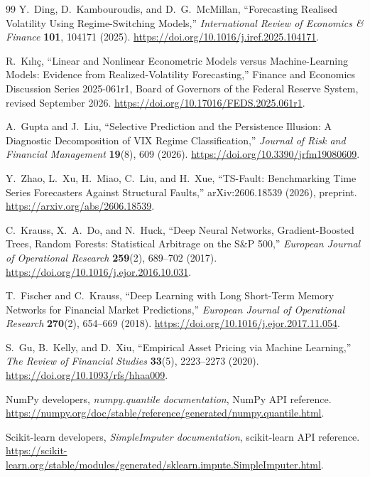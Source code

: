 \documentclass[11pt,a4paper]{article}
\begin{document}
\begin{thebibliography}{99}
Y.~Ding, D.~Kambouroudis, and D.~G.~McMillan,
``Forecasting Realised Volatility Using Regime-Switching Models,''
\emph{International Review of Economics \& Finance} \textbf{101}, 104171 (2025).
\url{https://doi.org/10.1016/j.iref.2025.104171}.

R.~K{\i}l{\i}\c{c},
``Linear and Nonlinear Econometric Models versus Machine-Learning Models: Evidence from Realized-Volatility Forecasting,''
Finance and Economics Discussion Series 2025-061r1,
Board of Governors of the Federal Reserve System, revised September 2026.
\url{https://doi.org/10.17016/FEDS.2025.061r1}.

A.~Gupta and J.~Liu,
``Selective Prediction and the Persistence Illusion: A Diagnostic Decomposition of VIX Regime Classification,''
\emph{Journal of Risk and Financial Management} \textbf{19}(8), 609 (2026).
\url{https://doi.org/10.3390/jrfm19080609}.

Y.~Zhao, L.~Xu, H.~Miao, C.~Liu, and H.~Xue,
``TS-Fault: Benchmarking Time Series Forecasters Against Structural Faults,''
arXiv:2606.18539 (2026), preprint.
\url{https://arxiv.org/abs/2606.18539}.

C.~Krauss, X.~A.~Do, and N.~Huck,
``Deep Neural Networks, Gradient-Boosted Trees, Random Forests: Statistical Arbitrage on the S\&P 500,''
\emph{European Journal of Operational Research} \textbf{259}(2), 689--702 (2017).
\url{https://doi.org/10.1016/j.ejor.2016.10.031}.

T.~Fischer and C.~Krauss,
``Deep Learning with Long Short-Term Memory Networks for Financial Market Predictions,''
\emph{European Journal of Operational Research} \textbf{270}(2), 654--669 (2018).
\url{https://doi.org/10.1016/j.ejor.2017.11.054}.

S.~Gu, B.~Kelly, and D.~Xiu,
``Empirical Asset Pricing via Machine Learning,''
\emph{The Review of Financial Studies} \textbf{33}(5), 2223--2273 (2020).
\url{https://doi.org/10.1093/rfs/hhaa009}.

NumPy developers,
\emph{numpy.quantile documentation}, NumPy API reference.
\url{https://numpy.org/doc/stable/reference/generated/numpy.quantile.html}.

Scikit-learn developers,
\emph{SimpleImputer documentation}, scikit-learn API reference.
\url{https://scikit-learn.org/stable/modules/generated/sklearn.impute.SimpleImputer.html}.


\end{thebibliography}
\end{document}

